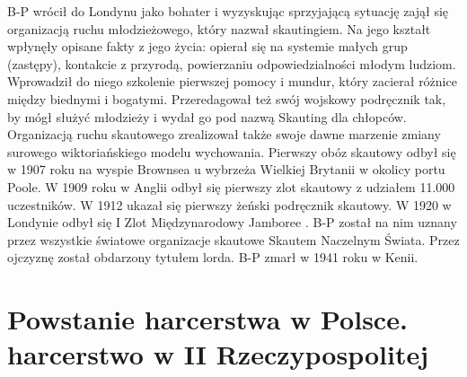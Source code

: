 B-P wrócił do Londynu jako bohater i wyzyskując sprzyjającą sytuację zajął się organizacją ruchu młodzieżowego, który nazwał skautingiem. Na jego kształt wpłynęły opisane fakty z jego życia: opierał się na systemie małych grup (zastępy), kontakcie z przyrodą, powierzaniu odpowiedzialności młodym ludziom. Wprowadził do niego szkolenie pierwszej pomocy i mundur, który zacierał różnice między biednymi i bogatymi. Przeredagował też swój wojskowy podręcznik tak, by mógł służyć młodzieży i wydał go pod nazwą Skauting dla chłopców. Organizacją ruchu skautowego zrealizował także swoje dawne marzenie zmiany surowego wiktoriańskiego modelu wychowania. Pierwszy obóz skautowy odbył się w 1907 roku na wyspie Brownsea u wybrzeża Wielkiej Brytanii w okolicy portu Poole. W 1909 roku w Anglii odbył się pierwszy zlot skautowy z udziałem 11.000 uczestników. W 1912 ukazał się pierwszy żeński podręcznik skautowy. W 1920 w Londynie odbył się I Zlot Międzynarodowy Jamboree . B-P został na nim uznany przez wszystkie światowe organizacje skautowe Skautem Naczelnym Świata. Przez ojczyznę został obdarzony tytułem lorda. B-P zmarł w 1941 roku w Kenii. 

\section{Powstanie harcerstwa w Polsce. harcerstwo w II Rzeczypospolitej}

